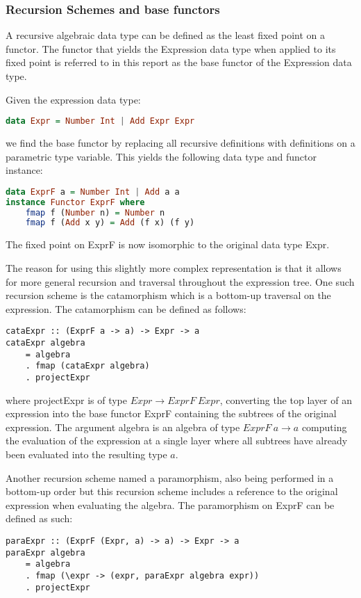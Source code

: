 \subsubsection{Recursion Schemes and base functors}

A recursive algebraic data type can be defined as the least fixed point on a functor. The functor that yields the Expression data type when applied to its fixed point is referred to in this report as the base functor of the Expression data type. \cite{meijer1991functional}

Given the expression data type:
\begin{lstlisting}[language=Haskell]
data Expr = Number Int | Add Expr Expr
\end{lstlisting}
we find the base functor by replacing all recursive definitions
with definitions on a parametric type variable. This yields the
following data type and functor instance:
\begin{lstlisting}[language=Haskell]
data ExprF a = Number Int | Add a a
instance Functor ExprF where
    fmap f (Number n) = Number n
    fmap f (Add x y) = Add (f x) (f y)
\end{lstlisting}
The fixed point on ExprF is now isomorphic to the original data type Expr.

The reason for using this slightly more complex representation is that it allows for more general recursion and traversal throughout the expression tree. One such recursion scheme is the catamorphism which is a bottom-up
traversal on the expression. The catamorphism can be defined as follows:
\begin{lstlisting}
cataExpr :: (ExprF a -> a) -> Expr -> a
cataExpr algebra 
    = algebra
    . fmap (cataExpr algebra)
    . projectExpr
\end{lstlisting}
where projectExpr is of type $Expr \rightarrow ExprF\ Expr$, converting
the top layer of an expression into the base functor ExprF containing the subtrees of the original expression. The argument algebra is an algebra of type $ExprF\ a \rightarrow a$ computing the evaluation of the expression at
a single layer where all subtrees have already been evaluated into the resulting type $a$.

Another recursion scheme named a paramorphism, also being performed in a
bottom-up order but this recursion scheme includes a reference to the original expression when evaluating the algebra. The paramorphism on ExprF
can be defined as such:

\noindent
\begin{minipage}{0.95\linewidth}
\begin{lstlisting}
paraExpr :: (ExprF (Expr, a) -> a) -> Expr -> a
paraExpr algebra
    = algebra
    . fmap (\expr -> (expr, paraExpr algebra expr))
    . projectExpr
\end{lstlisting}
\end{minipage}

